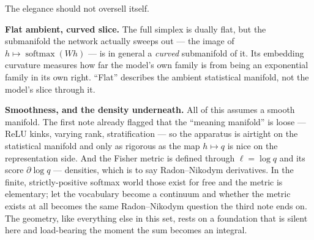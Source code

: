 \documentclass[11pt]{article}
\begin{document}
The elegance should not oversell itself.

\textbf{Flat ambient, curved slice.} The full simplex is dually flat, but the submanifold the
network actually sweeps out --- the image of $h \mapsto \operatorname{softmax}(Wh)$ --- is in
general a \emph{curved} submanifold of it. Its embedding curvature measures how far the model's
own family is from being an exponential family in its own right. ``Flat'' describes the ambient
statistical manifold, not the model's slice through it.

\textbf{Smoothness, and the density underneath.} All of this assumes a smooth manifold. The
first note already flagged that the ``meaning manifold'' is loose --- ReLU kinks, varying rank,
stratification --- so the apparatus is airtight on the statistical manifold and only as
rigorous as the map $h \mapsto q$ is nice on the representation side. And the Fisher metric is
defined through $\ell = \log q$ and its score $\partial \log q$ --- densities, which is to say
Radon--Nikodym derivatives. In the finite, strictly-positive softmax world those exist for
free and the metric is elementary; let the vocabulary become a continuum and whether the metric
exists at all becomes the same Radon--Nikodym question the third note ends on. The geometry,
like everything else in this set, rests on a foundation that is silent here and load-bearing
the moment the sum becomes an integral.
\end{document}
